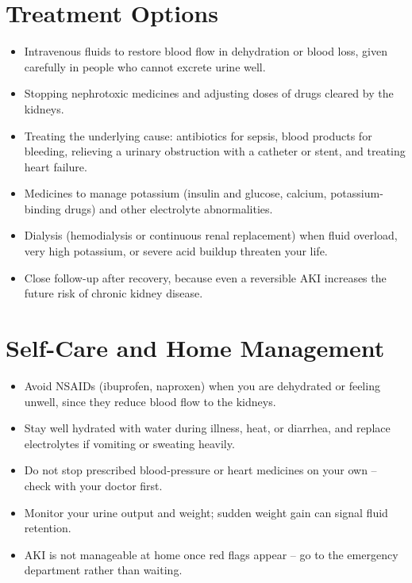 \section*{Treatment Options}
\begin{itemize}
  \item Intravenous fluids to restore blood flow in dehydration or blood loss, given carefully in people who cannot excrete urine well.
  \item Stopping nephrotoxic medicines and adjusting doses of drugs cleared by the kidneys.
  \item Treating the underlying cause: antibiotics for sepsis, blood products for bleeding, relieving a urinary obstruction with a catheter or stent, and treating heart failure.
  \item Medicines to manage potassium (insulin and glucose, calcium, potassium-binding drugs) and other electrolyte abnormalities.
  \item Dialysis (hemodialysis or continuous renal replacement) when fluid overload, very high potassium, or severe acid buildup threaten your life.
  \item Close follow-up after recovery, because even a reversible AKI increases the future risk of chronic kidney disease.
\end{itemize}


\section*{Self-Care and Home Management}
\begin{itemize}
  \item Avoid NSAIDs (ibuprofen, naproxen) when you are dehydrated or feeling unwell, since they reduce blood flow to the kidneys.
  \item Stay well hydrated with water during illness, heat, or diarrhea, and replace electrolytes if vomiting or sweating heavily.
  \item Do not stop prescribed blood-pressure or heart medicines on your own -- check with your doctor first.
  \item Monitor your urine output and weight; sudden weight gain can signal fluid retention.
  \item AKI is not manageable at home once red flags appear -- go to the emergency department rather than waiting.
\end{itemize}

